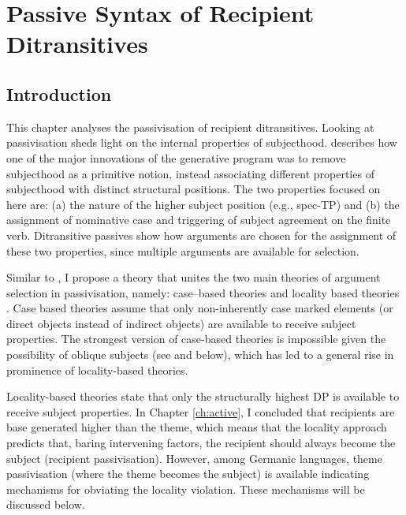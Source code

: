 \chapter{Passive Syntax of Recipient Ditransitives}
\section{Introduction}
This chapter analyses the passivisation of recipient ditransitives. Looking at passivisation sheds light on the internal properties of subjecthood. \cite{McCloskey.1997} describes how one of the major innovations of the generative program was to remove subjecthood as a primitive notion, instead associating different properties of subjecthood with distinct structural positions. The two properties focused on here are: (a) the nature of the higher subject position (e.g., spec-TP) and (b) the assignment of nominative case and triggering of subject agreement on the finite verb. Ditransitive passives show how arguments are chosen for the assignment of these two properties, since multiple arguments are available for selection.

Similar to \cite{Platzack.2005}, I propose a theory that unites the two main theories of argument selection in passivisation, namely: case--based theories \citep{Larson.1988,Baker.1988,Pesetsky.1996,Holmberg.2001} and locality based theories \citep{Falk.1990,Holmberg.1995,McGinnis.1998,Anagnostopoulou.2003}.  Case based theories assume that only non-inherently case marked elements (or direct objects instead of indirect objects) are available to receive subject properties. The strongest version of case-based theories is impossible given the possibility of oblique subjects (see \citealt{Zaenen.1985} and below), which has led to a general rise in prominence of locality-based theories.

Locality-based theories state that only the structurally highest DP is available to receive subject properties. In Chapter \ref{ch:active}, I concluded that recipients are base generated higher than the theme, which means that the locality approach predicts that, baring intervening factors, the recipient should always become the subject (recipient passivisation). However, among Germanic languages, theme passivisation (where the theme becomes the subject) is available indicating mechanisms for obviating the locality violation. These mechanisms will be discussed below.

